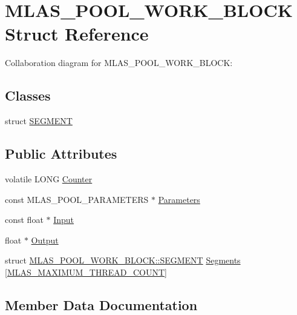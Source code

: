 \hypertarget{structMLAS__POOL__WORK__BLOCK}{}\section{M\+L\+A\+S\+\_\+\+P\+O\+O\+L\+\_\+\+W\+O\+R\+K\+\_\+\+B\+L\+O\+CK Struct Reference}
\label{structMLAS__POOL__WORK__BLOCK}


Collaboration diagram for M\+L\+A\+S\+\_\+\+P\+O\+O\+L\+\_\+\+W\+O\+R\+K\+\_\+\+B\+L\+O\+CK\+:
\subsection*{Classes}
\begin{DoxyCompactItemize}
\item 
struct \mbox{\hyperlink{structMLAS__POOL__WORK__BLOCK_1_1SEGMENT}{S\+E\+G\+M\+E\+NT}}
\end{DoxyCompactItemize}
\subsection*{Public Attributes}
\begin{DoxyCompactItemize}
\item 
volatile L\+O\+NG \mbox{\hyperlink{structMLAS__POOL__WORK__BLOCK_a527d1063e83f1213ca9bf1201185ead4}{Counter}}
\item 
const M\+L\+A\+S\+\_\+\+P\+O\+O\+L\+\_\+\+P\+A\+R\+A\+M\+E\+T\+E\+RS $\ast$ \mbox{\hyperlink{structMLAS__POOL__WORK__BLOCK_a95cb587fac38ae4d11a858b971077d8b}{Parameters}}
\item 
const float $\ast$ \mbox{\hyperlink{structMLAS__POOL__WORK__BLOCK_a09064265006f9256788079f69c9e8a52}{Input}}
\item 
float $\ast$ \mbox{\hyperlink{structMLAS__POOL__WORK__BLOCK_a5c1e7c71c631b2947b51f153183adaeb}{Output}}
\item 
struct \mbox{\hyperlink{structMLAS__POOL__WORK__BLOCK_1_1SEGMENT}{M\+L\+A\+S\+\_\+\+P\+O\+O\+L\+\_\+\+W\+O\+R\+K\+\_\+\+B\+L\+O\+C\+K\+::\+S\+E\+G\+M\+E\+NT}} \mbox{\hyperlink{structMLAS__POOL__WORK__BLOCK_aca08f4df1e834264494cef662495ad51}{Segments}} \mbox{[}\mbox{\hyperlink{mlasi_8h_a86466d6811df85b69801ae746e3ad493}{M\+L\+A\+S\+\_\+\+M\+A\+X\+I\+M\+U\+M\+\_\+\+T\+H\+R\+E\+A\+D\+\_\+\+C\+O\+U\+NT}}\mbox{]}
\end{DoxyCompactItemize}


\subsection{Member Data Documentation}
\mbox{\label{structMLAS__POOL__WORK__BLOCK_a527d1063e83f1213ca9bf1201185ead4}} 
